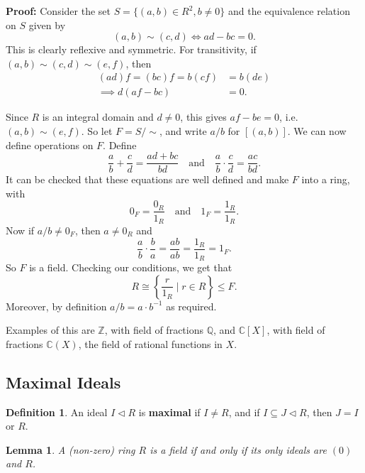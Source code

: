 \documentclass[12pt]{article}
\newtheorem{lemma}{Lemma}[section]
\theoremstyle{definition}
\newtheorem{definition}{Definition}[section]
\theoremstyle{remark}
\begin{document}
\begin{adjustbox}{minipage = \columnwidth - 25.5pt, margin=1em, frame=1pt, margin=0em}
	\textbf{Proof:} Consider the set $S = \{(a, b) \in R^2, b \neq 0\}$ and the equivalence relation on $S$ given by
	\[
		(a, b) \sim (c, d) \iff ad - bc = 0
	.\]
	This is clearly reflexive and symmetric. For transitivity, if $(a, b) \sim (c, d) \sim (e, f)$, then
	\begin{align*}
		(ad)f = (bc)f = b(cf) &= b(de) \\
		\implies d(af - bc) &= 0.
	\end{align*}
\end{adjustbox}

\begin{adjustbox}{minipage = \columnwidth - 25.5pt, margin=1em, frame=1pt, margin=0em}
	Since $R$ is an integral domain and $d \neq 0$, this gives $af - be = 0$, i.e. $(a, b) \sim (e, f)$. So let $F = S/\sim$, and write $a/b$ for $[(a, b)]$.
	We can now define operations on $F$. Define
	\[
		\frac{a}{b} + \frac{c}{d} = \frac{ad + bc}{bd} \quad \text{and} \quad \frac{a}{b} \cdot \frac{c}{d} = \frac{ac}{bd}
	.\]
	It can be checked that these equations are well defined and make $F$ into a ring, with
	\[
		0_{F} = \frac{0_{R}}{1_{R}} \quad \text{and} \quad 1_{F} = \frac{1_{R}}{1_{R}}
	.\]
	Now if $a/b \neq 0_{F}$, then $a \neq 0_{R}$ and
	\[
	\frac{a}{b} \cdot \frac{b}{a} = \frac{ab}{ab} = \frac{1_{R}}{1_{R}} = 1_{F}
	.\]
	So $F$ is a field. Checking our conditions, we get that
	\[
		R \cong \left\{ \frac{r}{1_{R}} \mid r \in R \right\} \leq F
	.\]
	Moreover, by definition $a/b = a \cdot b^{-1}$ as required.
\end{adjustbox}

Examples of this are $\mathbb{Z}$, with field of fractions $\mathbb{Q}$, and $\mathbb{C}[X]$, with field of fractions $\mathbb{C}(X)$, the field of rational functions in $X$.

\subsection{Maximal Ideals}%
\label{sub:maximal_ideals}

\begin{definition}
	An ideal $I \lhd R$ is \textbf{maximal} if $I \neq R$, and if $I \subseteq J \lhd R$, then $J = I$ or $R$.
\end{definition}

\begin{lemma}
	A (non-zero) ring $R$ is a field if and only if its only ideals are $(0)$ and $R$.
\end{lemma}
\end{document}
